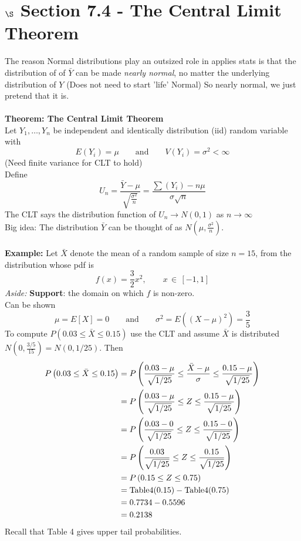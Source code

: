 \documentclass[12pt]{article}
\newcommand{\pars}[1]{\left( {#1} \right) }
\newcommand{\xbar}{\bar{X}}
\newcommand{\ybar}{\bar{Y}}
\newcommand{\N}[2]{N \left( {#1},{#2} \right)}
\newcommand{\yn}{Y_1, \dots, Y_n}
\begin{document}
\section*{$\S$ Section 7.4 - The Central Limit Theorem}
The reason Normal distributions play an outsized role in applies stats is that the distribution of of $\bar{Y}$ can be made \emph{nearly normal}, no matter the underlying distribution of $Y$ (Does not need to start 'life' Normal)
So nearly normal, we just pretend that it is.
\\\\\textbf{Theorem: The Central Limit Theorem}\\
Let $\yn$ be independent and identically distribution (iid) random variable with
$$E\pars{Y_i} = \mu \qquad \text{and} \qquad V(Y_i) = \sigma^2 < \infty$$
(Need finite variance for CLT to hold)\\
Define $$U_n = \frac{\bar{Y}-\mu}{\sqrt{\frac{\sigma^2}{n}}} = \frac{\sum (Y_i) - n\mu}{\sigma \sqrt{n}}$$
The CLT says the distribution function of $U_n \to N(0,1)$ as $n\to\infty$
\\Big idea: The distribution $\ybar$ can be thought of as $\N{\mu}{\frac{\sigma^2}{n}}$.
\\\\\textbf{Example:} Let $\xbar$ denote the mean of a random sample of size $n=15$, from the distribution whose pdf is $$f(x) = \frac{3}{2}x^2, \qquad x \,\in\, [-1,1]$$
\textit{Aside:} \textbf{Support}: the domain on which $f$ is non-zero. \\
Can be shown $$\mu = E[X] = 0 \qquad \text{and} \qquad \sigma^2 = E((X-\mu)^2) = \frac{3}{5}$$
To compute $P\pars{0.03 \leq \bar{X} \leq 0.15}$ use the CLT and assume $\bar{X}$ is distributed $\N{0}{\frac{3/5}{15}} = \N{0}{1/25}$.
Then
\begin{align}
        P\pars{0.03 \leq \bar{X} \leq 0.15} &= P\pars{\frac{0.03-\mu}{\sqrt{1/25}} \leq \frac{\xbar - \mu}{\sigma} \leq \frac{0.15-\mu}{\sqrt{1/25}}} \notag\\
        &= P\pars{\frac{0.03-\mu}{\sqrt{1/25}} \leq Z \leq \frac{0.15-\mu}{\sqrt{1/25}}} \notag\\
        &=  P\pars{\frac{0.03-0}{\sqrt{1/25}} \leq Z \leq \frac{0.15-0}{\sqrt{1/25}}} \notag \\
        & =  P\pars{\frac{0.03}{\sqrt{1/25}} \leq Z \leq \frac{0.15}{\sqrt{1/25}}} \notag\\
        &= P\pars{0.15\leq Z \leq 0.75} \notag \\
        &= \text{Table4}(0.15) - \text{Table4}(0.75)\notag\\
        &= 0.7734 - 0.5596 \notag\\
        &= 0.2138 \notag
    \end{align}
Recall that Table 4 gives upper tail probabilities.
\newpage
\end{document}
